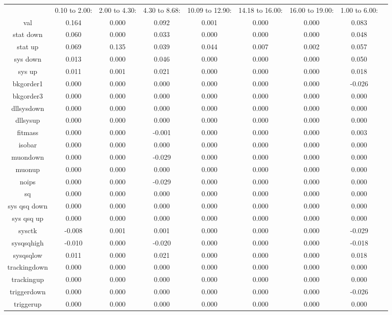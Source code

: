 \begin{table}[tbp]
\begin{tabular}{|c|c|c|c|c|c|c|c|c|}
\hline
 & 0.10 to  2.00: & 2.00 to  4.30: & 4.30 to  8.68: & 10.09 to  12.90: & 14.18 to  16.00: & 16.00 to  19.00: & 1.00 to  6.00:\\ 
val & 0.164 & 0.000 & 0.092 & 0.001 & 0.000 & 0.000 & 0.083\\ 
stat down & 0.060 & 0.000 & 0.033 & 0.000 & 0.000 & 0.000 & 0.048\\ 
stat up & 0.069 & 0.135 & 0.039 & 0.044 & 0.007 & 0.002 & 0.057\\ 
sys down & 0.013 & 0.000 & 0.046 & 0.000 & 0.000 & 0.000 & 0.050\\ 
sys up & 0.011 & 0.001 & 0.021 & 0.000 & 0.000 & 0.000 & 0.018\\ 
bkgorder1 & 0.000 & 0.000 & 0.000 & 0.000 & 0.000 & 0.000 & -0.026\\ 
bkgorder3 & 0.000 & 0.000 & 0.000 & 0.000 & 0.000 & 0.000 & 0.000\\ 
dllsysdown & 0.000 & 0.000 & 0.000 & 0.000 & 0.000 & 0.000 & 0.000\\ 
dllsysup & 0.000 & 0.000 & 0.000 & 0.000 & 0.000 & 0.000 & 0.000\\ 
fitmass & 0.000 & 0.000 & -0.001 & 0.000 & 0.000 & 0.000 & 0.003\\ 
isobar & 0.000 & 0.000 & 0.000 & 0.000 & 0.000 & 0.000 & 0.000\\ 
muondown & 0.000 & 0.000 & -0.029 & 0.000 & 0.000 & 0.000 & 0.000\\ 
muonup & 0.000 & 0.000 & 0.000 & 0.000 & 0.000 & 0.000 & 0.000\\ 
noips & 0.000 & 0.000 & -0.029 & 0.000 & 0.000 & 0.000 & 0.000\\ 
sq & 0.000 & 0.000 & 0.000 & 0.000 & 0.000 & 0.000 & 0.000\\ 
sys qsq down & 0.000 & 0.000 & 0.000 & 0.000 & 0.000 & 0.000 & 0.000\\ 
sys qsq up & 0.000 & 0.000 & 0.000 & 0.000 & 0.000 & 0.000 & 0.000\\ 
sysctk & -0.008 & 0.001 & 0.001 & 0.000 & 0.000 & 0.000 & -0.029\\ 
sysqsqhigh & -0.010 & 0.000 & -0.020 & 0.000 & 0.000 & 0.000 & -0.018\\ 
sysqsqlow & 0.011 & 0.000 & 0.021 & 0.000 & 0.000 & 0.000 & 0.018\\ 
trackingdown & 0.000 & 0.000 & 0.000 & 0.000 & 0.000 & 0.000 & 0.000\\ 
trackingup & 0.000 & 0.000 & 0.000 & 0.000 & 0.000 & 0.000 & 0.000\\ 
triggerdown & 0.000 & 0.000 & 0.000 & 0.000 & 0.000 & 0.000 & -0.026\\ 
triggerup & 0.000 & 0.000 & 0.000 & 0.000 & 0.000 & 0.000 & 0.000\\ 
\hline
\end{tabular}
\end{table}
